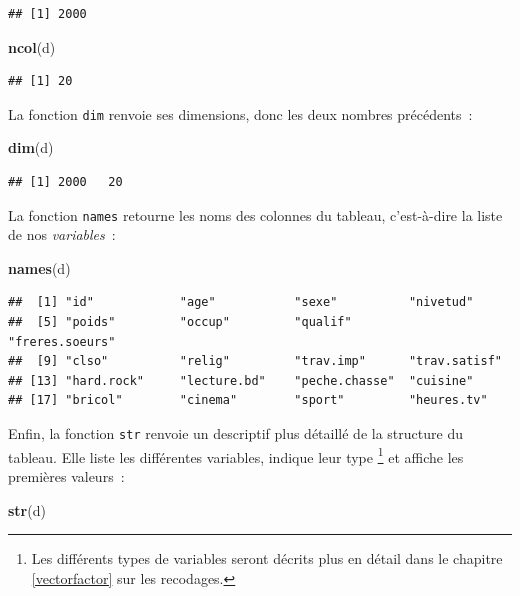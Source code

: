 \documentclass[
  12pt,
]{book}
\newenvironment{Shaded}{\begin{snugshade}}{\end{snugshade}}
\newcommand{\KeywordTok}[1]{\textcolor[rgb]{0.13,0.29,0.53}{\textbf{#1}}}
\newcommand{\NormalTok}[1]{#1}
\begin{document}
\begin{verbatim}
## [1] 2000
\end{verbatim}

\begin{Shaded}
\begin{Highlighting}[]
\KeywordTok{ncol}\NormalTok{(d)}
\end{Highlighting}
\end{Shaded}

\begin{verbatim}
## [1] 20
\end{verbatim}

La fonction \texttt{dim} renvoie ses dimensions, donc les deux nombres précédents~:

\begin{Shaded}
\begin{Highlighting}[]
\KeywordTok{dim}\NormalTok{(d)}
\end{Highlighting}
\end{Shaded}

\begin{verbatim}
## [1] 2000   20
\end{verbatim}

La fonction \texttt{names} retourne les noms des colonnes du tableau, c'est-à-dire la liste de nos \emph{variables}~:

\begin{Shaded}
\begin{Highlighting}[]
\KeywordTok{names}\NormalTok{(d)}
\end{Highlighting}
\end{Shaded}

\begin{verbatim}
##  [1] "id"            "age"           "sexe"          "nivetud"      
##  [5] "poids"         "occup"         "qualif"        "freres.soeurs"
##  [9] "clso"          "relig"         "trav.imp"      "trav.satisf"  
## [13] "hard.rock"     "lecture.bd"    "peche.chasse"  "cuisine"      
## [17] "bricol"        "cinema"        "sport"         "heures.tv"
\end{verbatim}

Enfin, la fonction \texttt{str} renvoie un descriptif plus détaillé de la structure du tableau. Elle liste les différentes variables, indique leur type \footnote{Les différents types de variables seront décrits plus en détail dans le chapitre \ref{vectorfactor} sur les recodages.} et affiche les premières valeurs~:

\begin{Shaded}
\begin{Highlighting}[]
\KeywordTok{str}\NormalTok{(d)}
\end{Highlighting}
\end{Shaded}
\end{document}
